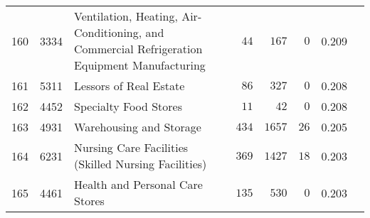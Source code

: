 \documentclass[9pt, oneside]{article}   	%
\begin{document}
\begin{longtable}{lcp{3 in}ccccc}
160  & 3334 & Ventilation, Heating, Air-Conditioning, and Commercial Refrigeration Equipment Manufacturing & $\phantom{00}44$ & $\phantom{0}167$ & $\phantom{0}0$ & 0.209 \\
161  & 5311 & Lessors of Real Estate & $\phantom{00}86$ & $\phantom{0}327$ & $\phantom{0}0$ & 0.208 \\
162  & 4452 & Specialty Food Stores & $\phantom{00}11$ & $\phantom{00}42$ & $\phantom{0}0$ & 0.208 \\
163  & 4931 & Warehousing and Storage & $\phantom{0}434$ & $1657$ & $26$ & 0.205 \\
164  & 6231 & Nursing Care Facilities (Skilled Nursing Facilities) & $\phantom{0}369$ & $1427$ & $18$ & 0.203 \\
165  & 4461 & Health and Personal Care Stores & $\phantom{0}135$ & $\phantom{0}530$ & $\phantom{0}0$ & 0.203 \\


\end{longtable}
\end{document}
